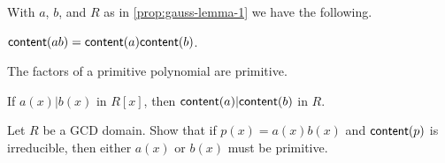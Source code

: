\begin{cor}
With \(a\), \(b\), and \(R\) as in \ref{prop:gauss-lemma-1} we have the following.
\begin{proplist}
\item \(\mathsf{content}(ab) = \mathsf{content}(a)\mathsf{content}(b)\).
\item The factors of a primitive polynomial are primitive.
\item If \(a(x)|b(x)\) in \(R[x]\), then \(\mathsf{content}(a)|\mathsf{content}(b)\) in \(R\).
\end{proplist}
\end{cor}



\Exercises%

\begin{exercise}
Let \(R\) be a GCD domain. Show that if \(p(x) = a(x)b(x)\) and \(\mathsf{content}(p)\) is irreducible, then either \(a(x)\) or \(b(x)\) must be primitive.
\end{exercise}
